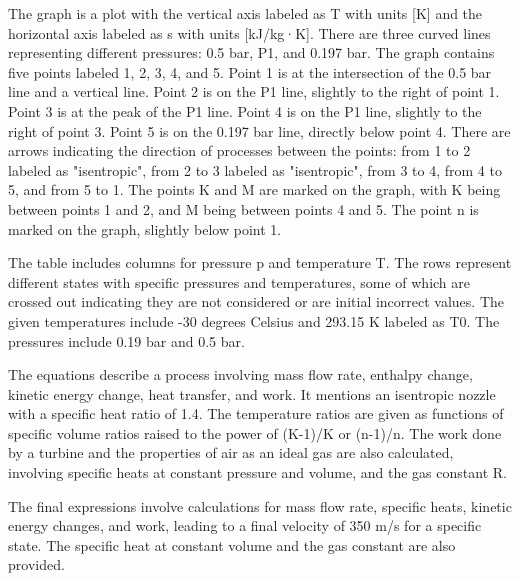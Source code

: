 The graph is a plot with the vertical axis labeled as T with units [K] and the horizontal axis labeled as s with units [kJ/kg·K]. There are three curved lines representing different pressures: 0.5 bar, P1, and 0.197 bar. The graph contains five points labeled 1, 2, 3, 4, and 5. Point 1 is at the intersection of the 0.5 bar line and a vertical line. Point 2 is on the P1 line, slightly to the right of point 1. Point 3 is at the peak of the P1 line. Point 4 is on the P1 line, slightly to the right of point 3. Point 5 is on the 0.197 bar line, directly below point 4. There are arrows indicating the direction of processes between the points: from 1 to 2 labeled as "isentropic", from 2 to 3 labeled as "isentropic", from 3 to 4, from 4 to 5, and from 5 to 1. The points K and M are marked on the graph, with K being between points 1 and 2, and M being between points 4 and 5. The point n is marked on the graph, slightly below point 1.

The table includes columns for pressure p and temperature T. The rows represent different states with specific pressures and temperatures, some of which are crossed out indicating they are not considered or are initial incorrect values. The given temperatures include -30 degrees Celsius and 293.15 K labeled as T0. The pressures include 0.19 bar and 0.5 bar.

The equations describe a process involving mass flow rate, enthalpy change, kinetic energy change, heat transfer, and work. It mentions an isentropic nozzle with a specific heat ratio of 1.4. The temperature ratios are given as functions of specific volume ratios raised to the power of (K-1)/K or (n-1)/n. The work done by a turbine and the properties of air as an ideal gas are also calculated, involving specific heats at constant pressure and volume, and the gas constant R.

The final expressions involve calculations for mass flow rate, specific heats, kinetic energy changes, and work, leading to a final velocity of 350 m/s for a specific state. The specific heat at constant volume and the gas constant are also provided.